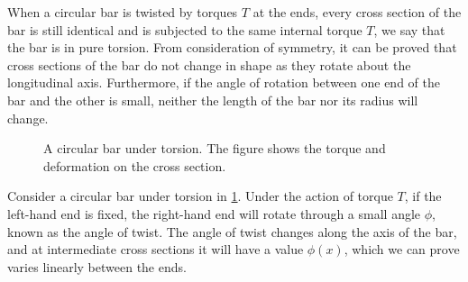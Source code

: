 \documentclass[
10pt,
a4paper,
openany,
svgnames,
]{kaobook} %
\begin{document}
When a circular bar is twisted by torques $T$ at the ends, every cross section of the bar is still identical and is subjected to the same internal torque $T$, we say that the bar is in pure torsion. From consideration of symmetry, it can be proved that cross sections of the bar do not change in shape as they rotate about the longitudinal axis. Furthermore, if the angle of rotation between one end of the bar and the other is small, neither the length of the bar nor its radius will change.

\begin{figure}[h]
  \centering
  \caption{A circular bar under torsion. The figure shows the torque and deformation on the cross section.}
  \label{fig: 3d torsional deformation}
\end{figure}

Consider a circular bar under torsion in \cref{fig: 3d torsional deformation}. Under the action of torque $T$, if the left-hand end is fixed, the right-hand end will rotate through a small angle $\phi$, known as the angle of twist. The angle of twist changes along the axis of the bar, and at intermediate cross sections it will have a value $\phi(x)$, which we can prove varies linearly between the ends.
\end{document}
